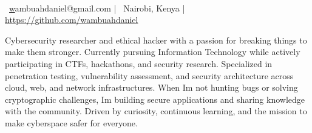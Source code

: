 \documentclass[]{resume-format}
\begin{document}
%


\setlength\fboxsep{10pt}%

\begingroup

\noindent
\colorbox{headerbg}{
  \parbox{\dimexpr\textwidth-2\fboxsep}{
    \color{white} %
    \begin{center} %
      \\[2mm] %
      \faEnvelope~\href{mailto:wambuahdaniel@gmail.com}wambuahdaniel@gmail.com %
      \quad|\quad %
      \faMapMarker~Nairobi, Kenya %
      \quad|\quad %
      \faLink~\href{ https://github.com/wambuahdaniel }{ https://github.com/wambuahdaniel } %
    \end{center} %
  }
}
\endgroup
\vspace{2mm} %



\begin{cvpersonalstatement}
  \item { Cybersecurity researcher and ethical hacker with a passion for breaking things to make them stronger.
Currently pursuing Information Technology while actively participating in CTFs, hackathons, and security research.
Specialized in penetration testing, vulnerability assessment, and security architecture across cloud, web, and network infrastructures.
When I\textquotesingle{}m not hunting bugs or solving cryptographic challenges, I\textquotesingle{}m building secure applications and sharing knowledge with the community.
Driven by curiosity, continuous learning, and the mission to make cyberspace safer for everyone.
 }
\end{cvpersonalstatement}


\end{document}
